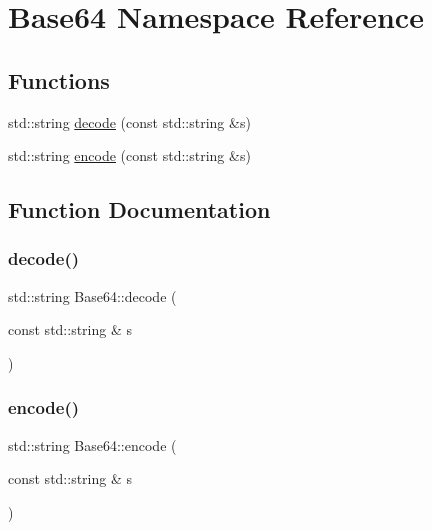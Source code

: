 \hypertarget{namespaceBase64}{}\section{Base64 Namespace Reference}
\label{namespaceBase64}
\subsection*{Functions}
\begin{DoxyCompactItemize}
\item 
std\+::string \mbox{\hyperlink{namespaceBase64_a2c98e3e63a2bce306db27684f4de73c6}{decode}} (const std\+::string \&s)
\item 
std\+::string \mbox{\hyperlink{namespaceBase64_a6ba74af3352d33faf6d08aa64607b5fe}{encode}} (const std\+::string \&s)
\end{DoxyCompactItemize}


\subsection{Function Documentation}
\mbox{\label{namespaceBase64_a2c98e3e63a2bce306db27684f4de73c6}} 
\subsubsection{\texorpdfstring{decode()}{decode()}}
{\footnotesize\ttfamily std\+::string Base64\+::decode (\begin{DoxyParamCaption}\item[{const std\+::string \&}]{s }\end{DoxyParamCaption})}

\mbox{\label{namespaceBase64_a6ba74af3352d33faf6d08aa64607b5fe}} 
\subsubsection{\texorpdfstring{encode()}{encode()}}
{\footnotesize\ttfamily std\+::string Base64\+::encode (\begin{DoxyParamCaption}\item[{const std\+::string \&}]{s }\end{DoxyParamCaption})}

